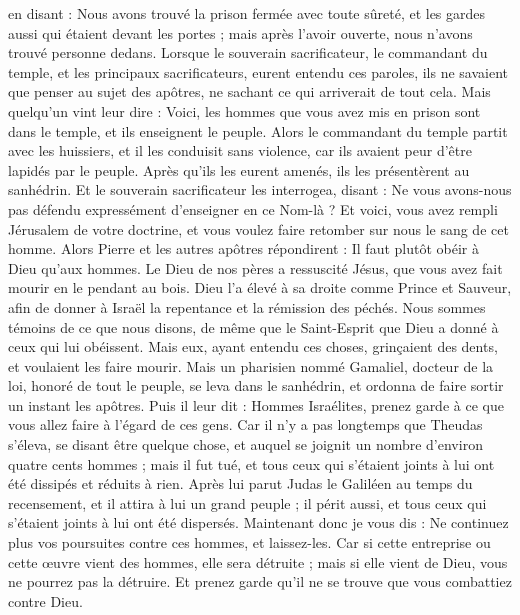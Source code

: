 \begin{multicols}{2}
en disant : Nous avons trouvé la prison fermée avec toute sûreté, et les gardes aussi qui étaient devant les portes ; mais après l'avoir ouverte, nous n'avons trouvé personne dedans.
Lorsque le souverain sacrificateur, le commandant du temple, et les principaux sacrificateurs, eurent entendu ces paroles, ils ne savaient que penser au sujet des apôtres, ne sachant ce qui arriverait de tout cela.
Mais quelqu'un vint leur dire : Voici, les hommes que vous avez mis en prison sont dans le temple, et ils enseignent le peuple.
Alors le commandant du temple partit avec les huissiers, et il les conduisit sans violence, car ils avaient peur d'être lapidés par le peuple.
Après qu’ils les eurent amenés, ils les présentèrent au sanhédrin. Et le souverain sacrificateur les interrogea,
disant : Ne vous avons-nous pas défendu expressément d'enseigner en ce Nom-là ? Et voici, vous avez rempli Jérusalem de votre doctrine, et vous voulez faire retomber sur nous le sang de cet homme.
Alors Pierre et les autres apôtres répondirent : Il faut plutôt obéir à Dieu qu'aux hommes.
Le Dieu de nos pères a ressuscité Jésus, que vous avez fait mourir en le pendant au bois.
Dieu l’a élevé à sa droite comme Prince et Sauveur, afin de donner à Israël la repentance et la rémission des péchés.
Nous sommes témoins de ce que nous disons, de même que le Saint-Esprit que Dieu a donné à ceux qui lui obéissent.
Mais eux, ayant entendu ces choses, grinçaient des dents, et voulaient les faire mourir.
Mais un pharisien nommé Gamaliel, docteur de la loi, honoré de tout le peuple, se leva dans le sanhédrin, et ordonna de faire sortir un instant les apôtres.
Puis il leur dit : Hommes Israélites, prenez garde à ce que vous allez faire à l’égard de ces gens.
Car il n’y a pas longtemps que Theudas s'éleva, se disant être quelque chose, et auquel se joignit un nombre d’environ quatre cents hommes ; mais il fut tué, et tous ceux qui s'étaient joints à lui ont été dissipés et réduits à rien.
Après lui parut Judas le Galiléen au temps du recensement, et il attira à lui un grand peuple ; il périt aussi, et tous ceux qui s'étaient joints à lui ont été dispersés.
Maintenant donc je vous dis : Ne continuez plus vos poursuites contre ces hommes, et laissez-les. Car si cette entreprise ou cette œuvre vient des hommes, elle sera détruite ;
mais si elle vient de Dieu, vous ne pourrez pas la détruire. Et prenez garde qu’il ne se trouve que vous combattiez contre Dieu.

\end{multicols}
